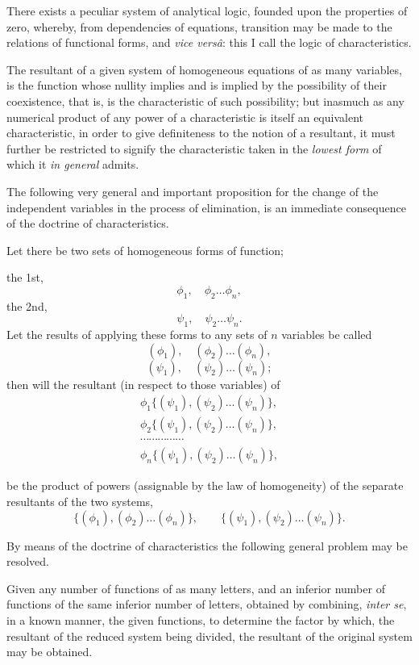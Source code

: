 \documentclass[11pt]{article}
\newcommand{\sourcepage}[1]{\marginpar{\scriptsize p.~#1}}
\begin{document}
{{\sourcepage{184}
There exists a peculiar system of analytical logic, founded upon the properties of zero, whereby, from dependencies of equations, transition may be made to the relations of functional forms, and \emph{vice vers\^a}: this I call the logic of characteristics.

The resultant of a given system of homogeneous equations of as many variables, is the function whose nullity implies and is implied by the possibility of their coexistence, that is, is the characteristic of such possibility; but inasmuch as any numerical product of any power of a characteristic is itself an equivalent characteristic, in order to give definiteness to the notion of a resultant, it must further be restricted to signify the characteristic taken in the \emph{lowest form} of which it \emph{in general} admits.

The following very general and important proposition for the change of the independent variables in the process of elimination, is an immediate consequence of the doctrine of characteristics.

Let there be two sets of homogeneous forms of function;

the 1st,
\[
 \phi_1,\quad \phi_2\ldots \phi_n,
\]
the 2nd,
\[
 \psi_1,\quad \psi_2\ldots \psi_n.
\]
Let the results of applying these forms to any sets of $n$ variables be called
\[
 (\phi_1),\quad(\phi_2)\ldots(\phi_n),
\]
\[
 (\psi_1),\quad(\psi_2)\ldots(\psi_n);
\]
then will the resultant (in respect to those variables) of
\[
\begin{gathered}
\phi_1\{(\psi_1),(\psi_2)\ldots(\psi_n)\},\\
\phi_2\{(\psi_1),(\psi_2)\ldots(\psi_n)\},\\
\cdots\cdots\cdots\cdots\cdots\\
\phi_n\{(\psi_1),(\psi_2)\ldots(\psi_n)\},
\end{gathered}
\]

\sourcepage{185}
be the product of powers (assignable by the law of homogeneity) of the separate resultants of the two systems,
\[
 \{(\phi_1),(\phi_2)\ldots(\phi_n)\},\qquad
 \{(\psi_1),(\psi_2)\ldots(\psi_n)\}.
\]

By means of the doctrine of characteristics the following general problem may be resolved.

Given any number of functions of as many letters, and an inferior number of functions of the same inferior number of letters, obtained by combining, \emph{inter se}, in a known manner, the given functions, to determine the factor by which, the resultant of the reduced system being divided, the resultant of the original system may be obtained.

}}
\end{document}
